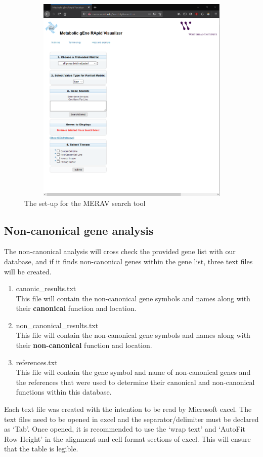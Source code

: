 \documentclass[11pt]{article}
\begin{document}
\begin{figure}[h!]
\centering
\includegraphics[width=15cm,height=10cm,keepaspectratio]{MERAV.png}
\caption{The set-up for the \acrshort{MERAV} search tool}
\label{fig:merav}
\end{figure}

\subsection{Non-canonical gene analysis}
The non-canonical analysis will cross check the provided gene list with our database, and if it finds non-canonical genes within the gene list, three text files will be created.
\begin{enumerate}
\item canonic\_results.txt\\
This file will contain the non-canonical gene symbols and names along with their \textbf{canonical} function and location.
\item non\_canonical\_results.txt\\
This file will contain the non-canonical gene symbols and names along with their \textbf{non-canonical} function and location.
\item references.txt\\
This file will contain the gene symbol and name of non-canonical genes and the references that were used to determine their canonical and non-canonical functions within this database.
\end{enumerate}
Each text file was created with the intention to be read by Microsoft excel. The text files need to be opened in excel and the separator/delimiter must be declared as `Tab'. Once opened, it is recommended to use the `wrap text' and `AutoFit Row Height' in the alignment and cell format sections of excel. This will ensure that the table is legible.
\end{document}

